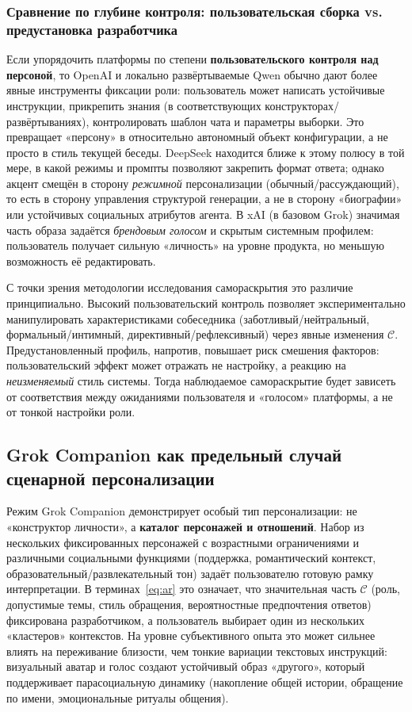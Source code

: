 \documentclass[areasetadvanced]{scrartcl}
\begin{document}
  \subsubsection{Сравнение по глубине контроля: пользовательская сборка vs. предустановка разработчика}
  
  Если упорядочить платформы по степени \textbf{пользовательского контроля над персоной}, то OpenAI и локально развёртываемые Qwen обычно дают более явные инструменты фиксации роли: пользователь может написать устойчивые инструкции, прикрепить знания (в соответствующих конструкторах/развёртываниях), контролировать шаблон чата и параметры выборки. Это превращает «персону» в относительно автономный объект конфигурации, а не просто в стиль текущей беседы. DeepSeek находится ближе к этому полюсу в той мере, в какой режимы и промпты позволяют закрепить формат ответа; однако акцент смещён в сторону \emph{режимной} персонализации (обычный/рассуждающий), то есть в сторону управления структурой генерации, а не в сторону «биографии» или устойчивых социальных атрибутов агента. В xAI (в базовом Grok) значимая часть образа задаётся \emph{брендовым голосом} и скрытым системным профилем: пользователь получает сильную «личность» на уровне продукта, но меньшую возможность её редактировать.
  
  С точки зрения методологии исследования самораскрытия это различие принципиально. Высокий пользовательский контроль позволяет экспериментально манипулировать характеристиками собеседника (заботливый/нейтральный, формальный/интимный, директивный/рефлексивный) через явные изменения $\mathcal{C}$. Предустановленный профиль, напротив, повышает риск смешения факторов: пользовательский эффект может отражать не настройку, а реакцию на \emph{неизменяемый} стиль системы. Тогда наблюдаемое самораскрытие будет зависеть от соответствия между ожиданиями пользователя и «голосом» платформы, а не от тонкой настройки роли.
  
  \subsection{Grok Companion как предельный случай сценарной персонализации}
  
  Режим Grok Companion демонстрирует особый тип персонализации: не «конструктор личности», а \textbf{каталог персонажей и отношений}. Набор из нескольких фиксированных персонажей с возрастными ограничениями и различными социальными функциями (поддержка, романтический контекст, образовательный/развлекательный тон) задаёт пользователю готовую рамку интерпретации. В терминах~\eqref{eq:ar} это означает, что значительная часть $\mathcal{C}$ (роль, допустимые темы, стиль обращения, вероятностные предпочтения ответов) фиксирована разработчиком, а пользователь выбирает один из нескольких «кластеров» контекстов. На уровне субъективного опыта это может сильнее влиять на переживание близости, чем тонкие вариации текстовых инструкций: визуальный аватар и голос создают устойчивый образ «другого», который поддерживает парасоциальную динамику (накопление общей истории, обращение по имени, эмоциональные ритуалы общения).
  
\end{document}
